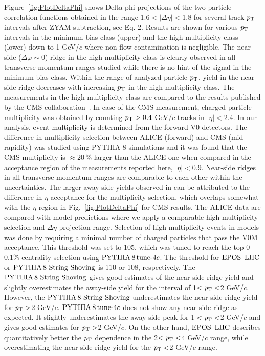 Figure~\ref{fig:PlotDeltaPhi} shows Delta phi projections of the two-particle correlation functions obtained in the range 1.6$<|\Delta \eta |<$1.8 for several track $p_\mathrm{T}$ intervals after ZYAM subtraction, see Eq. 2. Results are shown for various $\it{p}_{\rm{T}}$ intervals in the minimum bias class (upper) and the high-multiplicity class (lower) down to 1 GeV/$c$ where non-flow contamination is negligible. The near-side ($\Delta\varphi\sim 0$) ridge in the high-multiplicity class is clearly observed in all transverse momentum ranges studied while there is no hint of the signal in the minimum bias class. Within the range of analyzed particle $p_\mathrm{T}$, yield in the near-side ridge decreases with increasing $p_\mathrm{T}$ in the high-multiplicity class. The measurements in the high-multiplicity class are compared to the results published by the CMS collaboration~\cite{Khachatryan:2015lva}. In case of the CMS measurement, charged particle multiplicity was obtained by counting $p_\mathrm{T}>0.4$ GeV/$c$ tracks in $|\eta|<$2.4. In our analysis, event multiplicity is determined from the forward V0 detectors. The difference in multiplicity selection between ALICE (forward) and CMS (mid-rapidity) was studied using PYTHIA 8 simulations and it was found that the CMS multiplicity is ${\approx}20\,\%$ larger than the ALICE one when compared in the acceptance region of the measurements reported here, $|\eta|<$0.9. Near-side ridges in all transverse momentum ranges are comparable to each other within the uncertainties. The larger away-side yields observed in \cite{Khachatryan:2015lva} can be attributed to the difference in $\eta$ acceptance for the multiplicity selection, which overlaps somewhat with the $\eta$ region in Fig.~\ref{fig:PlotDeltaPhi} for CMS results. The ALICE data are compared with model predictions where we apply a comparable high-multiplicity selection and $\Delta\eta$ projection range. Selection of high-multiplicity events in models was done by requiring a minimal number of charged particles that pass the V0M acceptance. This threshold was set to 105, which was tuned to reach the top 0-0.1\% centrality selection using $\mathrm{PYTHIA}\,8\,\mathrm{tune}{\text -}4c$. The threshold for ${\mathrm{EPOS}\,~\mathrm{LHC}}$ or ${\mathrm{PYTHIA}\,8~\mathrm{String}~}\mathrm{Shoving}$ is 110 or 108, respectively. The ${\mathrm{PYTHIA}\,8~\mathrm{String}~}\mathrm{Shoving}$ gives good estimates of the near-side ridge yield and slightly overestimates the away-side yield for the interval of 1$<\it{p}_{\rm{T}}<$2 GeV/$c$. However, the ${\mathrm{PYTHIA}\,8~\mathrm{String}~}\mathrm{Shoving}$ underestimates the near-side ridge yield for $\it{p}_{\rm{T}}>$2 GeV/$c$. $\mathrm{PYTHIA}\,8\,\mathrm{tune}{\text -}4c$ does not show any near-side ridge as expected. It slightly underestimates the away-side peak for $1<\it{p}_{\rm{T}}<$2 GeV/$c$ and gives good estimates for $\it{p}_{\rm{T}}>$2 GeV/$c$. On the other hand, ${\mathrm{EPOS}\,~\mathrm{LHC}}$ describes quantitatively better the $p_\mathrm{T}$ dependence in the 2$<\it{p}_{\rm{T}}<$4 GeV/$c$ range, while overestimating the near-side ridge yield for the $\it{p}_{\rm{T}}<$2 GeV/$c$ range. 


